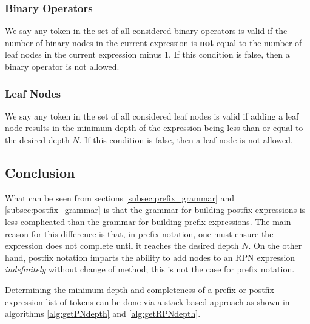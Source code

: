 \documentclass[12pt]{iopart}
\begin{document}
\subsubsection{Binary Operators}
We say any token in the set of all considered binary operators is valid if the number of binary nodes in the current expression is \textbf{not} equal to the number of leaf nodes in the current expression minus 1. If this condition is false, then a binary operator is not allowed.
\subsubsection{Leaf Nodes}
We say any token in the set of all considered leaf nodes is valid if adding a leaf node results in the minimum depth of the expression being less than or equal to the desired depth $N$. If this condition is false, then a leaf node is not allowed.

\subsection{Conclusion}
What can be seen from sections \ref{subsec:prefix_grammar} and \ref{subsec:postfix_grammar} is that the grammar for building postfix expressions is less complicated than the grammar for building prefix expressions. The main reason for this difference is that, in prefix notation, one must ensure the expression does not complete until it reaches the desired depth $N$. On the other hand, postfix notation imparts the ability to add nodes to an RPN expression \emph{indefinitely} without change of method; this is not the case for prefix notation. \par Determining the minimum depth and completeness of a prefix or postfix expression list of tokens can be done via a stack-based approach as shown in algorithms \ref{alg:getPNdepth} and \ref{alg:getRPNdepth}.

\end{document}
